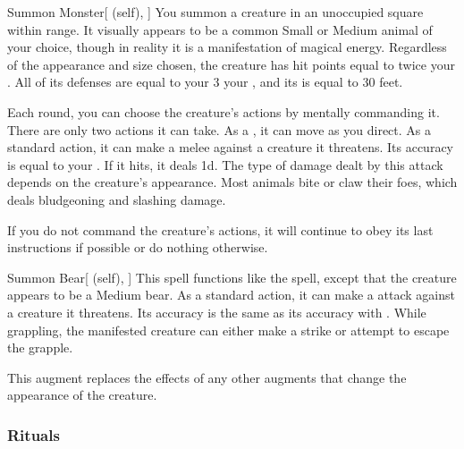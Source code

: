 \lowercase{\hypertarget{spell:Summon Monster}{}}\label{spell:Summon Monster}
\begin{attuneability}[\nth{1}]{\hypertarget{spell:Summon Monster}{Summon Monster}}[ (self), ]
You summon a creature in an unoccupied square within \rngmed range.
It visually appears to be a common Small or Medium animal of your choice, though in reality it is a manifestation of magical energy.
Regardless of the appearance and size chosen, the creature has hit points equal to twice your .
All of its defenses are equal to your 3 \add your , and its  is equal to 30 feet.

Each round, you can choose the creature's actions by mentally commanding it.
There are only two actions it can take.
As a , it can move as you direct.
As a standard action, it can make a melee  against a creature it threatens.
Its accuracy is equal to your .
If it hits, it deals  \minus1d.
The type of damage dealt by this attack depends on the creature's appearance.
Most animals bite or claw their foes, which deals bludgeoning and slashing damage.

If you do not command the creature's actions, it will continue to obey its last instructions if possible or do nothing otherwise.
\end{attuneability}
\vspace{0.25em}



\lowercase{\hypertarget{spell:Summon Bear}{}}\label{spell:Summon Bear}
\begin{attuneability}[\nth{2}]{\hypertarget{spell:Summon Bear}{Summon Bear}}[ (self), ]
This spell functions like the  spell, except that the creature appears to be a Medium bear.
As a standard action, it can make a  attack against a creature it threatens.
Its accuracy is the same as its accuracy with .
While grappling, the manifested creature can either make a strike or attempt to escape the grapple.

This augment replaces the effects of any other augments that change the appearance of the creature.
\end{attuneability}
\vspace{0.25em}



\subsubsection{Rituals}


